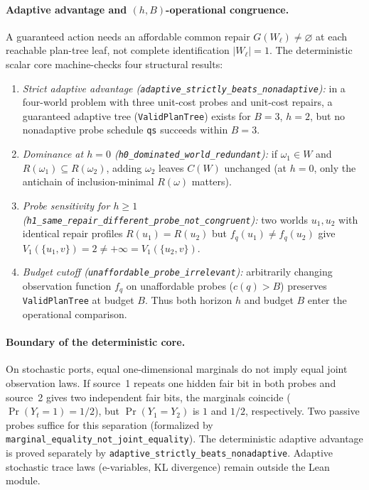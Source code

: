 \documentclass[11pt,a4paper]{article}
\theoremstyle{preprintthm}
\theoremstyle{preprintdef}
\begin{document}
\paragraph{Adaptive advantage and $(h,B)$-operational congruence.}
A guaranteed action needs an affordable common repair $G(W_\ell)\ne\varnothing$ at each reachable plan-tree leaf, not complete identification $|W_\ell|=1$. The deterministic scalar core machine-checks four structural results:
\begin{enumerate}
  \item \emph{Strict adaptive advantage (\texttt{adaptive\_\allowbreak strictly\_\allowbreak beats\_\allowbreak nonadaptive}):} in a four-world problem with three unit-cost probes and unit-cost repairs, a guaranteed adaptive tree (\texttt{ValidPlanTree}) exists for $B=3$, $h=2$, but no nonadaptive probe schedule \texttt{qs} succeeds within $B=3$.
  \item \emph{Dominance at $h=0$ (\texttt{h0\_dominated\_world\_redundant}):} if $\omega_1\in W$ and $R(\omega_1)\subseteq R(\omega_2)$, adding $\omega_2$ leaves $C(W)$ unchanged (at $h=0$, only the antichain of inclusion-minimal $R(\omega)$ matters).
  \item \emph{Probe sensitivity for $h\ge1$ (\texttt{h1\_\allowbreak same\_\allowbreak repair\_\allowbreak different\_\allowbreak probe\_\allowbreak not\_\allowbreak congruent}):} two worlds $u_1,u_2$ with identical repair profiles $R(u_1)=R(u_2)$ but $f_q(u_1)\ne f_q(u_2)$ give $V_1(\{u_1,v\})=2\ne+\infty=V_1(\{u_2,v\})$.
  \item \emph{Budget cutoff (\texttt{unaffordable\_probe\_irrelevant}):} arbitrarily changing observation function $f_q$ on unaffordable probes ($c(q)>B$) preserves \texttt{ValidPlanTree} at budget $B$. Thus both horizon $h$ and budget $B$ enter the operational comparison.
\end{enumerate}

\paragraph{Boundary of the deterministic core.}
On stochastic ports, equal one-dimensional marginals do not imply equal joint observation laws. If source~1 repeats one hidden fair bit in both probes and source~2 gives two independent fair bits, the marginals coincide ($\Pr(Y_t=1)=1/2$), but $\Pr(Y_1=Y_2)$ is $1$ and $1/2$, respectively. Two passive probes suffice for this separation (formalized by \texttt{marginal\_\allowbreak equality\_\allowbreak not\_\allowbreak joint\_\allowbreak equality}). The deterministic adaptive advantage is proved separately by \texttt{adaptive\_\allowbreak strictly\_\allowbreak beats\_\allowbreak nonadaptive}. Adaptive stochastic trace laws (e-variables, KL divergence) remain outside the Lean module.
\end{document}
